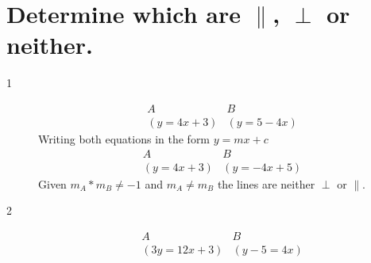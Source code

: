 \documentclass{article}
\begin{document}
\section[]{Determine which are $\parallel$, $\perp$ or neither.}
\begin{description}
    \item[1]
        $$
            \begin{array}{c}
                A \\
                (y = 4x +3)
            \end{array}
            \begin{array}{c}
                B \\
                (y = 5-4x)
            \end{array}
        $$
        Writing both equations in the form $y=mx+c$
        $$
            \begin{array}{c}
                A \\
                (y = 4x +3)
            \end{array}
            \begin{array}{c}
                B \\
                (y = -4x + 5)
            \end{array}
        $$
        Given $m_A*m_B \neq -1$ and $m_A \neq m_B$ the lines are neither $\perp$ or $\parallel$.
    \item[2]
        $$
            \begin{array}{c}
                A \\
                (3y=12x+3)
            \end{array}
            \begin{array}{c}
                B \\
                (y-5=4x)
            \end{array}
        $$


\end{description}
\end{document}
